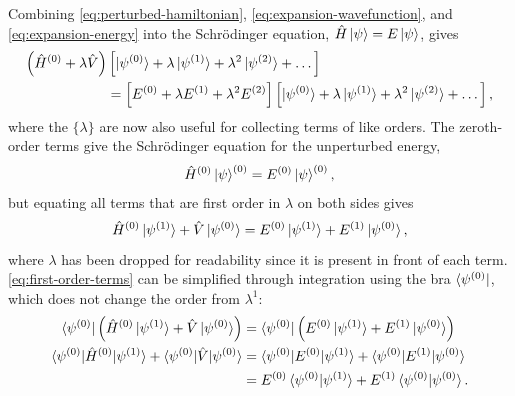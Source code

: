 \documentclass[%
class = book,%
crop = false,%
float = true,%
multi = true,%
preview = false,%
]{standalone}
\begin{document}
Combining \eqref{eq:perturbed-hamiltonian}, \eqref{eq:expansion-wavefunction}, and \eqref{eq:expansion-energy} into the Schr{\"{o}}dinger equation, \(\hat{H}\ket{\psi} = E\ket{\psi}\), gives
\begin{equation}
  \label{eq:expansion-schrodinger}
  \begin{aligned}
    \left( \hat{H}^{(0)} + \lambda\hat{V} \right) &\left[ \ket{\psi^{(0)}} + \lambda\ket{\psi^{(1)}} + \lambda^{2}\ket{\psi^{(2)}} + \dots \right] \\
    &= \left[ E^{(0)} + \lambda E^{(1)} + \lambda^{2} E^{(2)} \right] \left[ \ket{\psi^{(0)}} + \lambda\ket{\psi^{(1)}} + \lambda^{2}\ket{\psi^{(2)}} + \dots \right],
  \end{aligned}
\end{equation}
where the \(\{\lambda\}\) are now also useful for collecting terms of like orders. The zeroth-order terms give the Schr{\"{o}}dinger equation for the unperturbed energy,
\begin{equation}
  \label{eq:unperturbed-energy}
  \hat{H}^{(0)} \ket{\psi}^{(0)} = E^{(0)} \ket{\psi}^{(0)},
\end{equation}
but equating all terms that are first order in \(\lambda\) on both sides gives
\begin{equation}
  \label{eq:first-order-terms}
  \hat{H}^{(0)} \ket{\psi^{(1)}} + \hat{V} \ket{\psi^{(0)}} = E^{(0)} \ket{\psi^{(1)}} + E^{(1)} \ket{\psi^{(0)}},
\end{equation}
where \(\lambda\) has been dropped for readability since it is present in front of each term. \eqref{eq:first-order-terms} can be simplified through integration using the bra \(\bra{\psi^{(0)}}\), which does not change the order from \(\lambda^{1}\):
\begin{equation}
  \label{eq:first-order-terms-bra}
  \begin{aligned}
    \bra{\psi^{(0)}} \left( \hat{H}^{(0)} \ket{\psi^{(1)}} + \hat{V} \ket{\psi^{(0)}} \right) &= \bra{\psi^{(0)}} \left( E^{(0)} \ket{\psi^{(1)}} + E^{(1)} \ket{\psi^{(0)}} \right) \\
    \braket{\psi^{(0)} | \hat{H}^{(0)} | \psi^{(1)}} + \braket{\psi^{(0)} | \hat{V} | \psi^{(0)}} &= \braket{\psi^{(0)} | E^{(0)} | \psi^{(1)}} + \braket{\psi^{(0)} | E^{(1)} | \psi^{(0)}} \\
    &= E^{(0)} \braket{\psi^{(0)} | \psi^{(1)}} + E^{(1)} \braket{\psi^{(0)} | \psi^{(0)}}.
  \end{aligned}
\end{equation}
\end{document}
